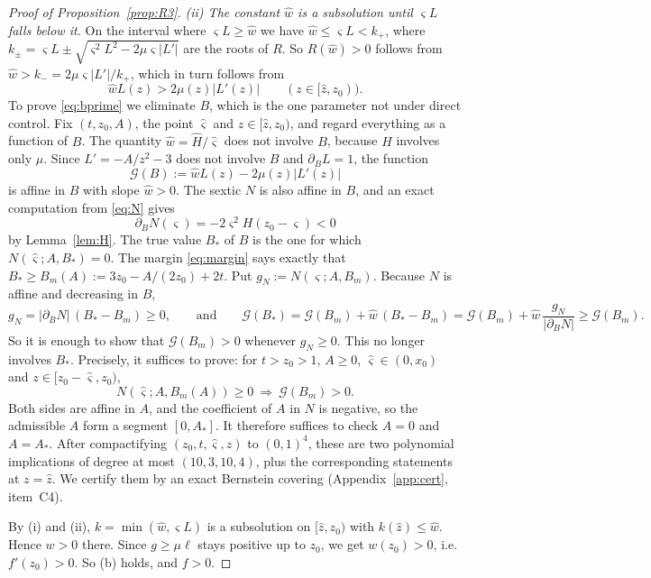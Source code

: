 \documentclass[11pt]{amsart}
\theoremstyle{definition}
\theoremstyle{remark}
\numberwithin{equation}{section}
\begin{document}
\begin{proof}[Proof of Proposition~\ref{prop:R3}]
\emph{(ii) The constant $\hat w$ is a subsolution until $\varsigma L$ falls below it.} On the interval where $\varsigma L\ge\hat w$ we have
$\hat w\le \varsigma L<k_+$, where $k_\pm=\varsigma L\pm\sqrt{\varsigma^2L^2-2\mu \varsigma|L'|}$ are the roots of $R$. So $R(\hat w)>0$ follows from
$\hat w>k_-=2\mu \varsigma|L'|/k_+$, which in turn follows from
\begin{equation}\label{eq:bprime}
\hat wL(z)>2\mu(z)|L'(z)|\qquad(z\in[\hat z,z_0)).
\end{equation}
To prove \eqref{eq:bprime} we eliminate $B$, which is the one parameter not under direct control. Fix
$(t,z_0,A)$, the point $\hat\varsigma$ and $z\in[\hat z,z_0)$, and regard everything as a function of $B$. The quantity
$\hat w=\hat H/\hat\varsigma$ does not involve $B$, because $H$ involves only $\mu$. Since $L'=-A/z^2-3$ does not involve
$B$ and $\partial_BL=1$, the function
\[
\mathcal G(B):=\hat wL(z)-2\mu(z)|L'(z)|
\]
is affine in $B$ with slope $\hat w>0$. The sextic $N$ is also affine in $B$, and an exact computation from
\eqref{eq:N} gives
\[
\partial_BN(\varsigma)=-2\varsigma^2H(z_0-\varsigma)<0
\]
by Lemma~\ref{lem:H}. The true value $B_*$ of $B$ is the one for which $N(\hat\varsigma;A,B_*)=0$. The margin
\eqref{eq:margin} says exactly that $B_*\ge B_m(A):=3z_0-A/(2z_0)+2t$. Put $g_N:=N(\hat\varsigma;A,B_m)$. Because $N$ is
affine and decreasing in $B$,
\[
g_N=|\partial_BN|\,(B_*-B_m)\ge0,\qquad\text{and}\qquad
\mathcal G(B_*)=\mathcal G(B_m)+\hat w\,(B_*-B_m)=\mathcal G(B_m)+\hat w\,\frac{g_N}{|\partial_BN|}\ge\mathcal G(B_m).
\]
So it is enough to show that $\mathcal G(B_m)>0$ whenever $g_N\ge0$. This no longer involves $B_*$. Precisely, it
suffices to prove: for $t>z_0>1$, $A\ge0$, $\hat \varsigma\in(0,x_0)$
and $z\in[z_0-\hat \varsigma,z_0)$,
\[
N(\hat \varsigma;A,B_m(A))\ge0\ \Longrightarrow\ \mathcal G(B_m)>0 .
\]
Both sides are affine in $A$, and the coefficient of $A$ in $N$ is negative, so the admissible $A$ form a segment
$[0,A_*]$. It therefore suffices to check $A=0$ and $A=A_*$. After compactifying $(z_0,t,\hat \varsigma,z)$ to $(0,1)^4$,
these are two polynomial implications of degree at most $(10,3,10,4)$, plus the corresponding statements at
$z=\hat z$. We certify them by an exact Bernstein covering (Appendix~\ref{app:cert}, item~C4).

By (i) and (ii), $k=\min(\hat w,\varsigma L)$ is a subsolution on $[\hat z,z_0)$ with $k(\hat z)\le\hat w$. Hence $w>0$
there. Since $g\ge\mu\ell$ stays positive up to $z_0$, we get $w(z_0)>0$, i.e. $f'(z_0)>0$.
So (b) holds, and $f>0$.
\end{proof}
\end{document}
